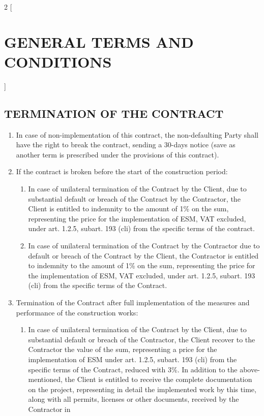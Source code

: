 \begin{multicols}{2} [\section{GENERAL TERMS AND CONDITIONS}]
    \subsection{TERMINATION OF THE CONTRACT}
    \begin{enumerate}
    \item In case of non-implementation of this contract, the
      non-defaulting Party shall have the right to break the contract,
      sending a 30-days notice (save as another term is prescribed
      under the provisions of this contract).
    \item If the contract is broken before the start of the
      construction period:
      \begin{enumerate}
      \item In case of unilateral termination of the Contract by the
        Client, due to substantial default or breach of the Contract
        by the Contractor, the Client is entitled to indemnity to the
        amount of 1\% on the sum, representing the price for the
        implementation of ESM, VAT excluded, under art. 1.2.5,
        subart. 193 (cli) from the specific terms of the contract.
      \item In case of unilateral termination of the Contract by the
        Contractor due to default or breach of the Contract by the
        Client, the Contractor is entitled to indemnity to the amount
        of 1\% on the sum, representing the price for the
        implementation of ESM, VAT excluded, under art.  1.2.5,
        subart. 193 (cli) from the specific terms of the Contract.
      \end{enumerate}
    \item Termination of the Contract after full implementation of the
      measures and performance of the construction works:
      \begin{enumerate}
      \item In case of unilateral termination of the Contract by the
        Client, due to substantial default or breach of the
        Contractor, the Client recover to the Contractor the value of
        the sum, representing a price for the implementation of ESM
        under art. 1.2.5, subart. 193 (cli) from the specific terms of
        the Contract, reduced with 3\%. In addition to the
        above-mentioned, the Client is entitled to receive the
        complete documentation on the project, representing in detail
        the implemented work by this time, along with all permits,
        licenses or other documents, received by the Contractor in

\end{enumerate}
\end{enumerate}
\end{multicols}
